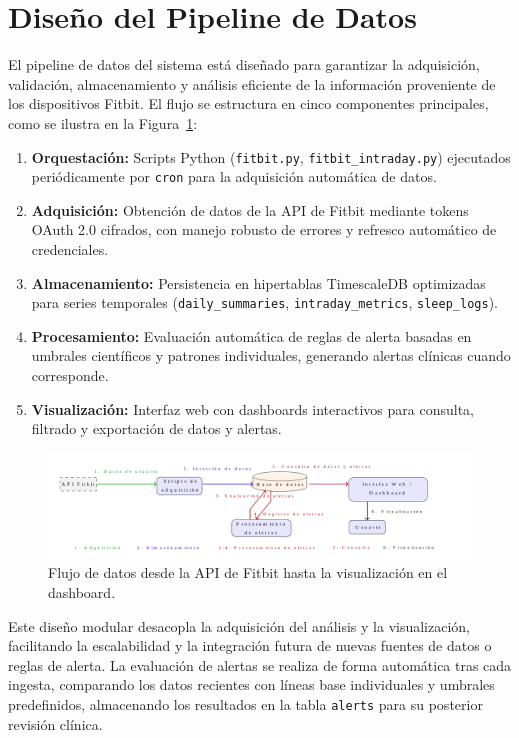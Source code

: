 \section{Diseño del Pipeline de Datos}
\label{sec:diseno_pipeline}

El pipeline de datos del sistema está diseñado para garantizar la adquisición, validación, almacenamiento y análisis eficiente de la información proveniente de los dispositivos Fitbit. El flujo se estructura en cinco componentes principales, como se ilustra en la Figura~\ref{fig:flujo_datos}:

\begin{enumerate}
    \item \textbf{Orquestación:} Scripts Python (\texttt{fitbit.py}, \texttt{fitbit\_intraday.py}) ejecutados periódicamente por \texttt{cron} para la adquisición automática de datos.
    \item \textbf{Adquisición:} Obtención de datos de la API de Fitbit mediante tokens OAuth 2.0 cifrados, con manejo robusto de errores y refresco automático de credenciales.
    \item \textbf{Almacenamiento:} Persistencia en hipertablas TimescaleDB optimizadas para series temporales (\texttt{daily\_summaries}, \texttt{intraday\_metrics}, \texttt{sleep\_logs}).
    \item \textbf{Procesamiento:} Evaluación automática de reglas de alerta basadas en umbrales científicos y patrones individuales, generando alertas clínicas cuando corresponde.
    \item \textbf{Visualización:} Interfaz web con dashboards interactivos para consulta, filtrado y exportación de datos y alertas.
\end{enumerate}

\begin{figure}[htbp]
    \centering
    \includegraphics[width=1\textwidth, height=0.3\textheight]{imagenes/flujo_datos.png}
    \caption{Flujo de datos desde la API de Fitbit hasta la visualización en el dashboard.}
    \label{fig:flujo_datos}
\end{figure}

Este diseño modular desacopla la adquisición del análisis y la visualización, facilitando la escalabilidad y la integración futura de nuevas fuentes de datos o reglas de alerta. La evaluación de alertas se realiza de forma automática tras cada ingesta, comparando los datos recientes con líneas base individuales y umbrales predefinidos, almacenando los resultados en la tabla \texttt{alerts} para su posterior revisión clínica.

